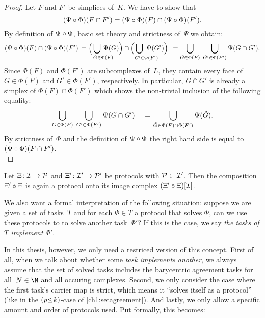 \begin{proof}
    Let $F$ and $F'$ be simplices of~$K$. We have to show that
    \[ (\Psi\after\Phi)(F\cap F')
        = (\Psi\after\Phi)(F) \cap (\Psi\after\Phi)(F')
    . \]
    By definition of $\Psi\after\Phi$, basic set theory and strictness
    of~$\Psi$ we obtain:
    \[ (\Psi\after\Phi)(F) \cap (\Psi\after\Phi)(F')
        \,=
        \Bigl( \mkern2mu \bigcup_{G\in\mathrlap{\Phi(F)}} \, \Psi(G) \Bigr)
            \cap \Bigl( \bigcup_{G'\in\mathrlap{\Phi(F')}} \, \Psi(G') \Bigr)
        \mkern8mu=
        \bigcup_{G\in\Phi(F)} \; \bigcup_{G'\in\Phi(F')}
            \Psi(G\cap G')
    . \]
    Since $\Phi(F)$ and $\Phi(F')$ are subcomplexes of~$L$, they contain every
    face of $G\in\Phi(F)$ and $G'\in\Phi(F')$, respectively. In particular,
    $G\cap G'$ is already a simplex of $\Phi(F)\cap\Phi(F')$ which shows the
    non-trivial inclusion of the following equality:
    \[ \bigcup_{G\in\Phi(F)} \; \bigcup_{G'\in\Phi(F')} \Psi(G\cap G')
        \quad\mkern2mu=\mkern2mu
        \bigcup_{\tilde G\in\Phi(F)\cap \Phi(F')} \Psi(\tilde G)
    . \]
    By strictness of~$\Phi$ and the definition of $\Psi\after\Phi$ the right
    hand side is equal to $(\Psi\after\Phi)(F\cap F')$.
    \\
\end{proof}

\begin{thCorollary}
    Let $\Xi\colon\mathcal{I}\to\mathcal{P}$ and $\Xi'\colon\mathcal{I}'\to\mathcal{P}'$ be protocols
    with $\mathcal{P}\subset\mathcal{I}'$. Then the composition $\Xi'\after\Xi$ is again
    a protocol onto its image complex $(\Xi'\after\Xi)[\cI]$.
\end{thCorollary}

We also want a formal interpretation of the following situation: suppose we are
given a set of tasks~$T$ and for each $\Phi\in T$ a protocol that
solves $\Phi$, can we use these protocols to to solve another task~$\Phi'$? If
this is the case, we say \emph{the tasks of $T$ implement $\Phi'$}.

In this thesis, however, we only need a restriced version of this concept.
First of all, when we talk about whether some \emph{task implements another},
we always assume that the set of solved tasks includes the barycentric agreement
tasks  for all~$N\in\N$ and all occuring
complexes. Second, we only consider the case where the first task's carrier map
is strict, which means it \enquote{solves itself as a protocol} (like in the
$(p\mkern1mu{\leq}\mkern1muk)$-case of \cref{ch1:setagreement}). And lastly, we
only allow a specific amount and order of protocols used. Put formally, this
becomes:

